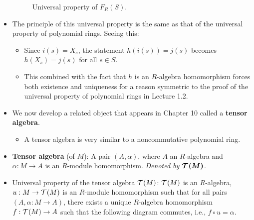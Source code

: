 \documentclass[../notes.tex]{subfiles}
\begin{document}
\begin{itemize}
\begin{figure}[H]
        \caption{Universal property of $F_R(S)$.}
        \label{fig:univPropFRS}
    \end{figure}
    \item The principle of this universal property is the same as that of the universal property of polynomial rings. Seeing this:
    \begin{itemize}
        \item Since $i(s)=X_s$, the statement $h(i(s))=j(s)$ becomes $h(X_s)=j(s)$ for all $s\in S$.
        \item This combined with the fact that $h$ is an $R$-algebra homomorphism forces both existence and uniqueness for a reason symmetric to the proof of the universal property of polynomial rings in Lecture 1.2.
    \end{itemize}
    \item We now develop a related object that appears in Chapter 10 called a \textbf{tensor algebra}.
    \begin{itemize}
        \item A tensor algebra is very similar to a noncommutative polynomial ring.
    \end{itemize}
    \item \textbf{Tensor algebra} (of $M$): A pair $(A,\alpha)$, where $A$ an $R$-algebra and $\alpha:M\to A$ is an $R$-module homomorphism. \emph{Denoted by} $\bm{\mathcal{T}^{}(M)}$.
    \item Universal property of the tensor algebra $\mathcal{T}^{}(M)$: $\mathcal{T}^{}(M)$ is an $R$-algebra, $u:M\to\mathcal{T}^{}(M)$ is an $R$-module homomorphism such that for all pairs $(A,\alpha:M\to A)$, there exists a unique $R$-algebra homomorphism $f:\mathcal{T}^{}(M)\to A$ such that the following diagram commutes, i.e., $f\circ u=\alpha$.
    \begin{figure}[H]
        \centering
\end{figure}
\end{itemize}
\end{document}
